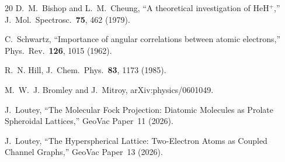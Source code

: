 \documentclass[aps,pra,twocolumn,superscriptaddress,longbibliography]{revtex4-2}
\begin{document}
\begin{thebibliography}{20}
D.~M.~Bishop and L.~M.~Cheung,
``A theoretical investigation of HeH$^+$,''
J.~Mol.\ Spectrosc.\ \textbf{75}, 462 (1979).

C.~Schwartz,
``Importance of angular correlations between atomic electrons,''
Phys.\ Rev.\ \textbf{126}, 1015 (1962).

R.~N. Hill,
J.\ Chem.\ Phys.\ \textbf{83}, 1173 (1985).

M.~W.~J. Bromley and J.~Mitroy, arXiv:physics/0601049.

J.~Loutey,
``The Molecular Fock Projection: Diatomic Molecules as Prolate
Spheroidal Lattices,''
GeoVac Paper~11 (2026).

J.~Loutey,
``The Hyperspherical Lattice: Two-Electron Atoms as Coupled
Channel Graphs,''
GeoVac Paper~13 (2026).

\end{thebibliography}
\end{document}
